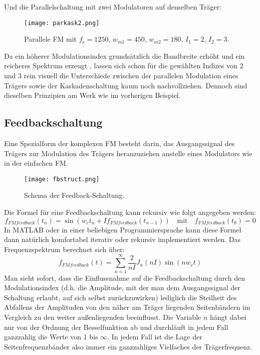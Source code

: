\FloatBarrier
Und die Parallelschaltung mit zwei Modulatoren auf denselben Träger:
\FloatBarrier
\begin{figure} [ht]
\centering
  \texttt{[image: parkask2.png]}
\caption{Parallele FM mit $f_c = 1250$, $w_{m1} = 450$, $w_{m2} = 180$, $I_1 = 2$, $I_2 = 3$. }
\end{figure}
\FloatBarrier
Da ein höherer Modulationsindex grundsätzlich die Bandbreite erhöht und ein reicheres Spektrum erzeugt \cite{chowningPaper}, lassen sich schon für die gewählten Indizes von $2$ und $3$ rein visuell die Unterschiede zwischen der parallelen Modulation eines Trägers sowie der Kaskadenschaltung kaum noch nachvollziehen. Dennoch sind dieselben Prinzipien am Werk wie im vorherigen Beispiel.

\subsection{Feedbackschaltung}

Eine Spezialform der komplexen FM besteht darin, das Ausgangssignal des Trägers zur Modulation des Trägers heranzuziehen anstelle eines Modulators wie in der einfachen FM. 
\FloatBarrier
\begin{figure} [ht]
\centering
  \texttt{[image: fbstruct.png]}
\caption{Schema der Feedback-Schaltung. }
\end{figure}
\FloatBarrier
Die Formel für eine Feedbackschaltung kann rekursiv wie folgt angegeben werden:
\begin{equation}
f_{FMfeedback}(t_{n}) = \sin(w_{c}t_{n} + If_{FMfeedback}(t_{n-1})) \quad \text{mit} \quad f_{FMfeedback}(t_{0}) = 0
\end{equation}
In MATLAB oder in einer beliebigen Programmiersprache kann diese Formel dann natürlich komfortabel iterativ oder rekursiv implementiert werden.
Das Frequenzspektrum berechnet sich \cite{schottiWeb} über:
\begin{equation}
f_{FMfeedback}(t) = \sum_{n=1}^{\infty}\frac{2}{nI}J_n(nI)\sin(nw_{c}t)
\end{equation}
Man sieht sofort, dass die Einflussnahme auf die Feedbackschaltung durch den Modulationsindex (d.h. die Amplitude, mit der man dem Ausgangssignal der Schaltung erlaubt, auf sich selbst zurückzuwirken) lediglich die Steilheit des Abfallens der Amplituden von den näher am Träger liegenden Seitenbändern im Vergleich zu den weiter außenliegenden beeinflusst. Die Variable $n$ hängt dabei nur von der Ordnung der Besselfunktion ab und durchläuft in jedem Fall ganzzahlig die Werte von 1 bis $\infty$. In jedem Fall ist die Lage der Seitenfrequenzbänder also immer ein ganzzahliges Vielfaches der Trägerfrequenz. 


